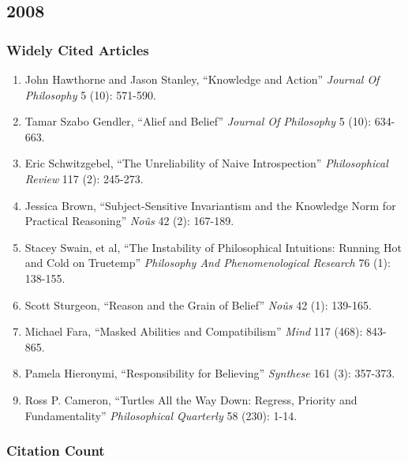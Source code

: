 \documentclass[
  10pt,
  letterpaper,
  DIV=11,
  numbers=noendperiod,
  twoside]{scrartcl}
\providecommand{\tightlist}{%
  \setlength{\itemsep}{0pt}\setlength{\parskip}{0pt}}\usepackage{longtable,booktabs,array}
\begin{document}
\newpage

\subsection{2008}\label{section-32}

\subsubsection*{Widely Cited Articles}\label{widely-cited-articles-32}

\begin{enumerate}
\def\labelenumi{\arabic{enumi}.}
\tightlist
\item
  John Hawthorne and Jason Stanley, ``Knowledge and Action''
  \emph{Journal Of Philosophy} 5 (10): 571-590.
\item
  Tamar Szabo Gendler, ``Alief and Belief'' \emph{Journal Of Philosophy}
  5 (10): 634-663.
\item
  Eric Schwitzgebel, ``The Unreliability of Naive Introspection''
  \emph{Philosophical Review} 117 (2): 245-273.
\item
  Jessica Brown, ``Subject-Sensitive Invariantism and the Knowledge Norm
  for Practical Reasoning'' \emph{Noûs} 42 (2): 167-189.
\item
  Stacey Swain, et al, ``The Instability of Philosophical Intuitions:
  Running Hot and Cold on Truetemp'' \emph{Philosophy And
  Phenomenological Research} 76 (1): 138-155.
\item
  Scott Sturgeon, ``Reason and the Grain of Belief'' \emph{Noûs} 42 (1):
  139-165.
\item
  Michael Fara, ``Masked Abilities and Compatibilism'' \emph{Mind} 117
  (468): 843-865.
\item
  Pamela Hieronymi, ``Responsibility for Believing'' \emph{Synthese} 161
  (3): 357-373.
\item
  Ross P. Cameron, ``Turtles All the Way Down: Regress, Priority and
  Fundamentality'' \emph{Philosophical Quarterly} 58 (230): 1-14.
\end{enumerate}

\subsubsection*{Citation Count}\label{citation-count-32}
\end{document}
